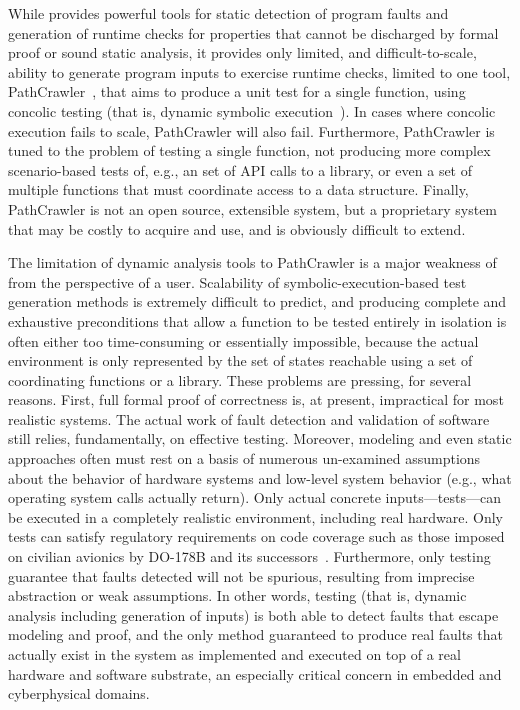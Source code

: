 While \framac{} provides powerful tools for static detection of program faults and generation of runtime checks for properties that cannot be discharged by formal proof or sound static analysis, it provides only limited, and difficult-to-scale, ability to generate program inputs to exercise runtime checks, limited to one tool, PathCrawler~\cite{WilliamsMMR05EDCC}, that aims to produce a unit test for a single function, using concolic testing (that is, dynamic symbolic execution~\cite{GodefroidKS05}).  In cases where concolic execution fails to scale, PathCrawler will also fail.  Furthermore, PathCrawler is tuned to the problem of testing a single function, not producing more complex scenario-based tests of, e.g., an set of API calls to a library, or even a set of multiple functions that must coordinate access to a data structure.  Finally, PathCrawler is not an open source, extensible system, but a proprietary system that may be costly to acquire and use, and is obviously difficult to extend.

The limitation of dynamic analysis tools to PathCrawler is a major weakness of \framac from the perspective of a user.  Scalability of symbolic-execution-based test generation methods is extremely difficult to predict, and producing complete and exhaustive preconditions that allow a function to be tested entirely in isolation is often either too time-consuming or essentially impossible, because the actual environment is only represented by the set of states reachable using a set of coordinating functions or a library.  These problems are pressing, for several reasons.  First, full formal proof of correctness is, at present, impractical for most realistic systems.  The actual work of fault detection and validation of software still relies, fundamentally, on effective testing.  Moreover, modeling and even static approaches often must rest on a basis of numerous un-examined assumptions about the behavior of hardware systems and low-level system behavior (e.g., what operating system calls actually return).  Only actual concrete inputs---tests---can be executed in a completely realistic environment, including real hardware.  Only tests can satisfy regulatory requirements on code coverage such as those imposed on civilian avionics by DO-178B and its successors~\cite{MCDC}.  Furthermore, only testing guarantee that faults detected will not be spurious, resulting from imprecise abstraction or weak assumptions.  In other words, testing (that is, dynamic analysis including generation of inputs) is both able to detect faults that escape modeling and proof, and the only method guaranteed to produce real faults that actually exist in the system as implemented and executed on top of a real hardware and software substrate, an especially critical concern in embedded and cyberphysical domains.

